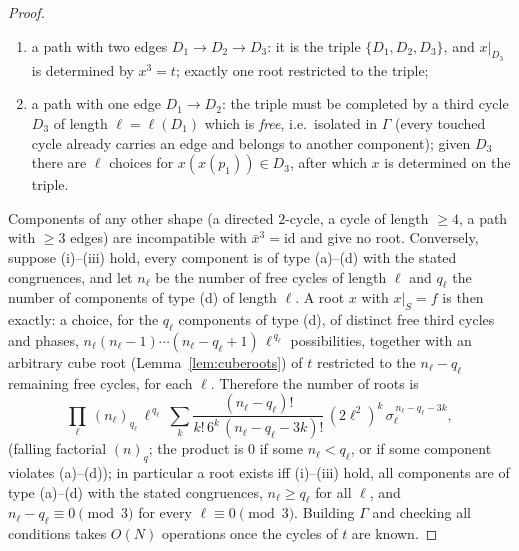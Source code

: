 \begin{proof}
\begin{enumerate}
\item[(c)] a path with two edges $D_1\to D_2\to D_3$: it is the triple $\{D_1,D_2,D_3\}$, and $x|_{D_3}$ is determined by $x^{3}=t$; exactly one root restricted to the triple;
\item[(d)] a path with one edge $D_1\to D_2$: the triple must be completed by a third cycle $D_3$ of length $\ell=\ell(D_1)$ which is \emph{free}, i.e.\ isolated in $\Gamma$ (every touched cycle already carries an edge and belongs to another component); given $D_3$ there are $\ell$ choices for $x(x(p_1))\in D_3$, after which $x$ is determined on the triple.
\end{enumerate}
Components of any other shape (a directed $2$-cycle, a cycle of length $\ge4$, a path with $\ge3$ edges) are incompatible with $\bar x^{3}=\mathrm{id}$ and give no root. Conversely, suppose (i)--(iii) hold, every component is of type (a)--(d) with the stated congruences, and let $n_\ell$ be the number of free cycles of length $\ell$ and $q_\ell$ the number of components of type (d) of length $\ell$. A root $x$ with $x|_S=f$ is then exactly: a choice, for the $q_\ell$ components of type (d), of distinct free third cycles and phases, $n_\ell(n_\ell-1)\cdots(n_\ell-q_\ell+1)\,\ell^{\,q_\ell}$ possibilities, together with an arbitrary cube root (Lemma~\ref{lem:cuberoots}) of $t$ restricted to the $n_\ell-q_\ell$ remaining free cycles, for each $\ell$. Therefore the number of roots is
\begin{equation}\label{eq:prescribedcount}
\prod_{\ell}\ (n_\ell)_{q_\ell}\,\ell^{\,q_\ell}\ \sum_{k}\frac{(n_\ell-q_\ell)!}{k!\,6^{k}\,(n_\ell-q_\ell-3k)!}\,(2\ell^{2})^{k}\,\sigma_\ell^{\,n_\ell-q_\ell-3k},
\end{equation}
(falling factorial $(n)_q$; the product is $0$ if some $n_\ell<q_\ell$, or if some component violates (a)--(d)); in particular a root exists iff (i)--(iii) hold, all components are of type (a)--(d) with the stated congruences, $n_\ell\ge q_\ell$ for all $\ell$, and $n_\ell-q_\ell\equiv0\pmod 3$ for every $\ell\equiv0\pmod3$. Building $\Gamma$ and checking all conditions takes $O(N)$ operations once the cycles of $t$ are known.
\end{proof}


